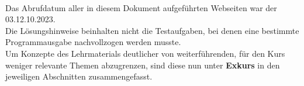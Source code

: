 \Hinweise

\paragraph*{}

Das Abrufdatum aller in diesem Dokument aufgeführten Webseiten war der 03.12.10.2023.\\

Die Lösungshinweise beinhalten nicht die Testaufgaben, bei denen eine bestimmte Programmausgabe nachvollzogen werden musste.\\

Um Konzepte des Lehrmaterials deutlicher von weiterführenden, für den Kurs weniger relevante Themen abzugrenzen, sind diese nun unter \textbf{Exkurs} in den jeweiligen Abschnitten zusammengefasst.